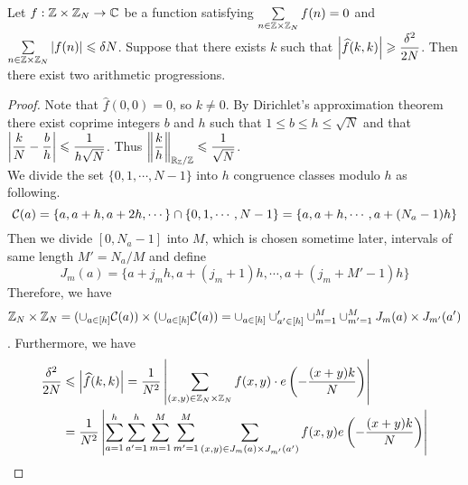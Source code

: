 \begin{lemma}
	Let $ f : {\mathbb Z} \times {\mathbb Z}_N \rightarrow {\mathbb C} $ be a function satisfying $ \sum\limits_{n \in {\mathbb Z} \times {\mathbb Z}_N} f(n) = 0 $ and $\sum\limits_{n \in {\mathbb Z} \times {\mathbb Z}_N} \left\vert{f(n)}\right\vert \leqslant \delta N $. Suppose that there exists $ k $ such that $ \left\vert{\widehat{f}(k, k)}\right\vert \geqslant \dfrac{\delta^2}{2N} $. Then there exist two arithmetic progressions. 
\end{lemma}

\begin{proof}
	Note that $ \widehat{f}(0,0) = 0 $, so $ k \neq 0 $. By Dirichlet's approximation theorem there exist coprime integers $ b $ and $ h $ such that $ 1 \leq b \leq h \leq \sqrt{N} $ and that $ \left\vert{\dfrac{k}{N} - \dfrac{b}{h}}\right\vert \leqslant \dfrac{1}{h \sqrt{N}} $. Thus $ \left\| \dfrac{k}{h}\right\|_{{\mathbb R}_{\mathbb Z}/{\mathbb Z}} \leqslant \dfrac{1}{\sqrt{N}} $. \\
	We divide the set $ \{0, 1, \cdots, N-1\} $ into $ h $ congruence classes modulo $ h $ as following. 
	$$ {\mathcal C}(a) = \{a , a+h, a+ 2h, \cdots\} \cap \{0, 1, \cdots, N-1\} = \{a, a+h, \cdots, a+(N_a -1 )h \} $$
	Then we divide $ [0, N_a -1] $ into $ M $, which is chosen sometime later, intervals of same length $ M' = N_a/M $ and define
	$$ J_m(a) = \{a + j_m h , a+ (j_m +1)h, \cdots, a + (j_m + M' -1)h \} $$
	Therefore, we have 
	$$ {\mathbb Z}_N \times {\mathbb Z}_N = (\cup_{a \in [h]} {\mathcal C}(a)) \times (\cup_{a \in [h]} {\mathcal C}(a)) = \cup_{a \in [h]} \cup_{a' \in [h]}' \cup_{m =1}^{M} \cup_{m' = 1}^M J_m(a) \times J_{m'}(a') $$.
	Furthermore, we have 
	\begin{align*}
		\dfrac{\delta^2}{2N} &\leq \abs{\widehat{f}(k,k)} = \dfrac{1}{N^2} \abs{\sum\limits_{(x,y) \in \bbZ_N \times \bbZ_N}  f(x,y) \cdot e\left(-\dfrac{(x+y)k}{N}\right)}\\
		& = \dfrac{1}{N^2} \abs{\sum\limits_{a = 1}^h \sum\limits_{a' = 1} ^h \sum\limits_{m = 1}^M \sum\limits_{m' = 1}^M \sum\limits_{(x,y) \in J_m(a) \times J_{m'}(a')} f(x,y) e\left(-\dfrac{(x+y)k}{N}\right)}
	\end{align*}


\end{proof}

